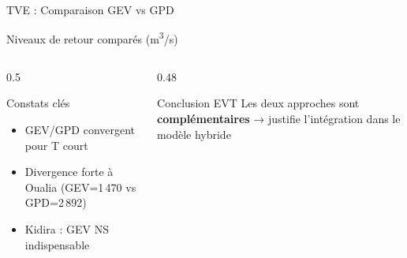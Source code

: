 \documentclass[aspectratio=169, 9pt]{beamer}
\begin{document}
\begin{frame}{TVE : Comparaison GEV vs GPD}
\begin{block}{Niveaux de retour comparés (m\textsuperscript{3}/s)}
\centering
{}
\end{block}
\vspace{0.15cm}
\begin{columns}
\begin{column}{0.5\textwidth}
  \begin{alertblock}{Constats clés}
  \small
    \begin{itemize}
      \item GEV/GPD convergent pour T court
      \item Divergence forte à Oualia
            (GEV=1\,470 vs GPD=2\,892)
      \item Kidira : GEV NS indispensable
    \end{itemize}
  \end{alertblock}
\end{column}
\begin{column}{0.48\textwidth}
  \begin{block}{Conclusion EVT}
  \small
    Les deux approches sont
    \textbf{complémentaires} → justifie
    l'intégration dans le modèle hybride
  \end{block}
\end{column}
\end{columns}
\end{frame}
\end{document}
